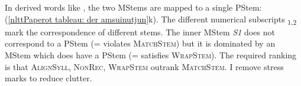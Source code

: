 In derived words like \textit{}, the two MStems are mapped to a single PStem: \textit{} (\ref{nlttPaperot tableau: der amsuinutjun}k). The different numerical subscripts \textsubscript{1,2} 
mark the correspondence of different stems. The inner MStem \textit{S1} does not correspond to a PStem (= violates \textsc{MatchStem}) but it is dominated by an MStem which does have a PStem (= satisfies \textsc{WrapStem}). The required ranking is that \textsc{AlignSyll, NonRec, WrapStem} outrank \textsc{MatchStem}. I remove stress marks to reduce clutter.












\begin{exe}
	\ex ~\\
	
	\vspace{-1cm} \label{nlttPaperot tableau: der amsuinutjun} 
\end{exe}
